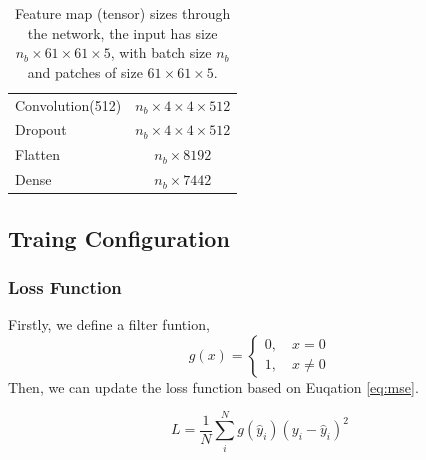 \begin{table}[h!]
\begin{tabular}{ l | c  }
            Convolution(512) & $n_b\times4\times4\times512$  \\
            Dropout & $n_b\times4\times4\times512$ \\
            Flatten & $n_b\times8192$ \\
            Dense & $n_b\times7442$ \\    
        \end{tabular}
        \caption{Feature map (tensor) sizes through the network, the input has size $n_b\times61\times61\times5$, with batch size $n_b$ and patches of size $61\times61\times5$.}
        \label{table:layers}
    \end{table}

\subsection{Traing Configuration}
\subsubsection{Loss Function}
Firstly, we define a filter funtion,
\begin{equation}
    g(x)= \begin{cases} 0, \quad x = 0 \\ 1, \quad x \ne 0 \end{cases}
\end{equation}
Then, we can update the loss function based on Euqation \ref{eq:mse}. 

\begin{equation}
    L = \frac{1}{N}\sum_{i}^{N}g(\hat{y}_i)(y_i-\hat{y}_i)^2
\end{equation}

